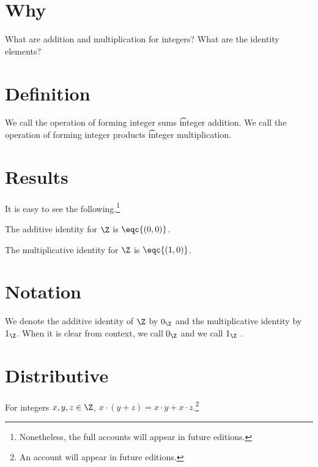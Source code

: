 

\section*{Why}

What are addition and multiplication for integers?
What are the identity elements?

\section*{Definition}

We call the operation of forming integer sums \t{integer addition}.
We call the operation of forming integer products \t{integer multiplication}.

\section*{Results}

It is easy to see the following.\footnote{Nonetheless, the full accounts will appear in future editions.}

\begin{proposition}
The additive identity for $\Z $ is $\eqc{(0, 0)}$.\end{proposition}
\begin{proposition}
The multiplicative identity for $\Z $ is $\eqc{(1, 0)}$.\end{proposition}
\section*{Notation}

We denote the additive identity of $\Z $ by $0_{\Z }$ and the multiplicative identity by $1_{\Z }$.
When it is clear from context, we call $0_{\Z }$  and we call $1_{\Z }$ .

\section*{Distributive}

\begin{proposition}
For integers $x, y, z \in \Z $, $x \cdot  (y + z) = x\cdot y + x\cdot  z$.\footnote{An account will appear in future editions.}\end{proposition}
\blankpage